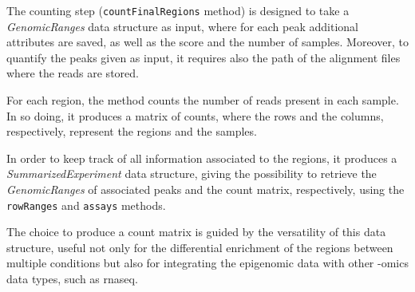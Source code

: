 The counting step (\lstinline!countFinalRegions! method) is designed to take a \textit{GenomicRanges} data structure as input, where for each peak additional attributes are saved, as well as the score and the number of samples.
Moreover, to quantify the peaks given as input, it requires also the path of the alignment files where the reads are stored.

For each region, the method counts the number of reads present in each sample.
In so doing, it produces a matrix of counts, where the rows and the columns, respectively, represent the regions and the samples.

In order to keep track of all information associated to the regions, it produces a \textit{SummarizedExperiment} \cite{SummExp} data structure, giving the possibility to retrieve the \textit{GenomicRanges} of associated peaks and the count matrix, respectively, using the \lstinline!rowRanges! and \lstinline!assays! methods.

The choice to produce a count matrix is guided by the versatility of this data structure, useful not only for the differential enrichment of the regions between multiple conditions but also for integrating the epigenomic data with other -omics data types, such as \gls{rnaseq}.